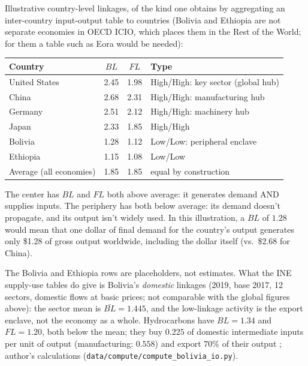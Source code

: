 \documentclass[../structural_economics_book.tex]{subfiles}
\begin{document}
\begin{example}\label{ch16:ex:global_linkages}
Illustrative country-level linkages, of the kind one obtains by aggregating an inter-country input-output table to countries (Bolivia and Ethiopia are not separate economies in OECD ICIO, which places them in the Rest of the World; for them a table such as Eora would be needed):

\begin{center}
\begin{tabular}{lccl}
\toprule
Country & $BL$ & $FL$ & Type \\
\midrule
United States & 2.45 & 1.98 & High/High: key sector (global hub) \\
China & 2.68 & 2.31 & High/High: manufacturing hub \\
Germany & 2.51 & 2.12 & High/High: machinery hub \\
Japan & 2.33 & 1.85 & High/High \\
Bolivia & 1.28 & 1.12 & Low/Low: peripheral enclave \\
Ethiopia & 1.15 & 1.08 & Low/Low \\
\midrule
Average (all economies) & 1.85 & 1.85 & equal by construction \\
\bottomrule
\end{tabular}
\end{center}

The center has $BL$ and $FL$ both above average: it generates demand AND supplies inputs. The periphery has both below average: its demand doesn't propagate, and its output isn't widely used. In this illustration, a $BL$ of $1.28$ would mean that one dollar of final demand for the country's output generates only \$1.28 of gross output worldwide, including the dollar itself (vs.\ \$2.68 for China).

The Bolivia and Ethiopia rows are placeholders, not estimates. What the INE supply-use tables do give is Bolivia's \emph{domestic} linkages (2019, base 2017, 12 sectors, domestic flows at basic prices; not comparable with the global figures above): the sector mean is $\bar{BL} = 1.445$, and the low-linkage activity is the export enclave, not the economy as a whole. Hydrocarbons have $BL = 1.34$ and $FL = 1.20$, both below the mean; they buy $0.225$ of domestic intermediate inputs per unit of output (manufacturing: $0.558$) and export $70\%$ of their output \citep{ine2026sut}; author's calculations (\texttt{data/compute/compute\_bolivia\_io.py}).
\end{example}
\end{document}
